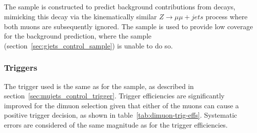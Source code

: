 \subsection{\mmj}
The \mmj sample is constructed to predict background contributions from \zinv 
decays, mimicking this decay via the kinematically similar $Z\to\mu\mu + jets$
process where both muons are subsequently ignored.
The sample is used to provide low \HT coverage for the \zinv background 
prediction, where the \gj sample (section~\ref{sec:gjets_control_sample})
is unable to do so.

\subsubsection{Triggers}
The trigger used is the same as for the \mj sample, as described in
section~\ref{sec:mujets_control_trigger}. Trigger efficiencies are significantly
improved for the dimuon selection given that either of the muons 
can cause a positive trigger decision, as shown in table~\ref{tab:dimuon-trig-effs}. 
Systematic errors are considered of the same magnitude as for the \mj trigger
efficiencies.

                                       

